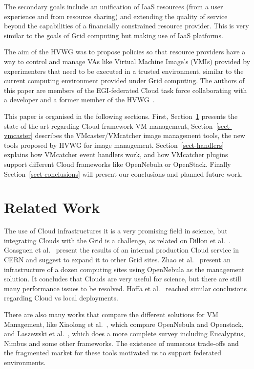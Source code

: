 \documentclass{cai}
\begin{document}
The secondary goals include an unification of IaaS resources (from a user experience and from resource sharing) and extending the quality of service beyond the capabilities of a financially constrained resource provider.
This is very similar to the goals of Grid computing but making use of IaaS platforms.

The aim of the HVWG was to propose policies so that resource providers have a way to control and manage VAs like Virtual Machine Image's (VMIs) provided by experimenters that need to be executed in a trusted environment, similar to the current computing environment provided under Grid computing. 
The authors of this paper are members of the EGI-federated Cloud task force collaborating with a developer and a former member of the HVWG~\cite{hepix}.

This paper is organised in the following sections. First, Section~\ref{sect-relatedwork} presents the state of the art regarding Cloud framework VM management, Section~\ref{sect-vmcaster} describes the VMcaster/VMcatcher image management tools, the new tools proposed by HVWG for image management. 
Section~\ref{sect-handlers} explains how VMcatcher event handlers work, and how VMcatcher plugins support different Cloud frameworks like OpenNebula or OpenStack.
Finally Section~\ref{sect-conclusions} will present our conclusions and planned future work.

\section{Related Work}
\label{sect-relatedwork}
The use of Cloud infrastructures it is a very promising field in science, but integrating Clouds with the Grid is a challenge, as related on Dillon et al.~\cite{Dillon2010}. Goasguen et al.~\cite{Goasguen2012} present the results of an internal production Cloud service in CERN and suggest to expand it to other Grid sites. Zhao et al.~\cite{Zhao2012} present an infrastructure of a dozen computing sites using OpenNebula as the management solution. It concludes that Clouds are very useful for science, but there are still many performance issues to be resolved. Hoffa et al.~\cite{Hoffa2008} reached similar conclusions regarding Cloud vs local deployments.

There are also many works that compare the different solutions for VM Management, like Xiaolong et al.~\cite{Xiaolong2012}, which compare OpenNebula and Openstack, and Laszewski et al.~\cite{Laszewski2012}, which does a more complete survey including Eucalyptus, Nimbus and some other frameworks. The existence of numerous trade-offs and the fragmented market for these tools motivated us to support federated environments.
\end{document}
